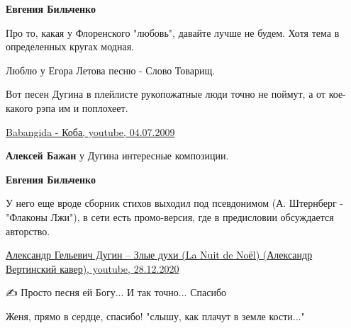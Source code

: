 \begin{itemize}
\begin{itemize}
\textbf{Евгения Бильченко} 

Про то, какая у Флоренского "любовь", давайте лучше не будем. Хотя тема в
определенных кругах модная.


Люблю у Егора Летова песню - Слово Товарищ.

\end{itemize} %


Вот песен Дугина в плейлисте рукопожатные люди точно не поймут, а от кое-какого
рэпа им и поплохеет. 

\href{https://www.youtube.com/watch?v=Naa3biMAwKU}{%
Babangida - Коба, youtube, 04.07.2009%
}

\begin{itemize} %
\textbf{Алексей Бажан} у Дугина интересные композиции.

\textbf{Евгения Бильченко} 

У него еще вроде сборник стихов выходил под псевдонимом (А. Штернберг -
"Флаконы Лжи"), в сети есть промо-версия, где в предисловии обсуждается
авторство. 

\href{https://www.youtube.com/watch?v=T18v96BG2rI}{%
Александр Гельевич Дугин – Злые духи (La Nuit de Noёl) (Александр Вертинский кавер), youtube, %
28.12.2020%
}

\end{itemize} %

✍ Просто песня ей Богу... И так точно... Спасибо


Женя, прямо в сердце, спасибо!
"слышу, как плачут в земле кости..."


\end{itemize} %
